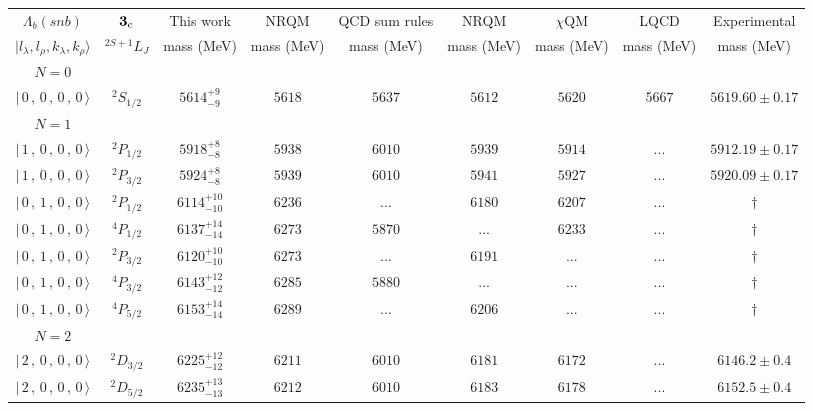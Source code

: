 \begin{tabular}{c c| c c c c c c c}\hline \hline
$\Lambda_{b}(snb)$& ${\bf {3}}_{\rm c}$& This work   &   NRQM \cite{Yoshida2015}     &  QCD sum rules \cite{Liu2008, Mao2015, Chen2016}      &  NRQM \cite{Roberts2008}    & $\chi$QM \cite{Kim2021}        & LQCD \cite{Mohanta2020}     & Experimental  \\ 
 $\vert l_{\lambda}, l_{\rho}, k_{\lambda}, k_{\rho} \rangle$ & $^{2S+1}L_{J}$ & mass (MeV)  &   mass (MeV)  &  mass (MeV)  &  mass (MeV) & mass (MeV) & mass (MeV) &      mass (MeV) \\ \hline
\hline
 $N=0$  &  &  &  &  &  \\ 
$\vert \,0\,,\,0\,,\,0\,,\,0 \,\rangle $ & $^{2}S_{1/2}$ & $5614^{+9}_{-9}$ & $5618$ & $5637$ & $5612$ & $5620$ & $5667$ & $5619.60\pm 0.17$ \\ 
\hline
 $N=1$  &  &  &  &  &  \\ 
$\vert \,1\,,\,0\,,\,0\,,\,0 \,\rangle $ & $^{2}P_{1/2}$ & $5918^{+8}_{-8}$ & $5938$ & $6010$ & $5939$ & $5914$ & ... & $5912.19\pm 0.17$ \\ 
$\vert \,1\,,\,0\,,\,0\,,\,0 \,\rangle $ & $^{2}P_{3/2}$ & $5924^{+8}_{-8}$ & $5939$ & $6010$ & $5941$ & $5927$ & ... & $5920.09\pm 0.17$ \\ 
$\vert \,0\,,\,1\,,\,0\,,\,0 \,\rangle $ & $^{2}P_{1/2}$ & $6114^{+10}_{-10}$ & $6236$ & ... & $6180$ & $6207$ & ... & $\dagger$ \\ 
$\vert \,0\,,\,1\,,\,0\,,\,0 \,\rangle $ & $^{4}P_{1/2}$ & $6137^{+14}_{-14}$ & $6273$ & $5870$ & ... & $6233$ & ... & $\dagger$ \\ 
$\vert \,0\,,\,1\,,\,0\,,\,0 \,\rangle $ & $^{2}P_{3/2}$ & $6120^{+10}_{-10}$ & $6273$ & ... & $6191$ & ... & ... & $\dagger$ \\ 
$\vert \,0\,,\,1\,,\,0\,,\,0 \,\rangle $ & $^{4}P_{3/2}$ & $6143^{+12}_{-12}$ & $6285$ & $5880$ & ... & ... & ... & $\dagger$ \\ 
$\vert \,0\,,\,1\,,\,0\,,\,0 \,\rangle $ & $^{4}P_{5/2}$ & $6153^{+14}_{-14}$ & $6289$ & ... & $6206$ & ... & ... & $\dagger$ \\ 
\hline
 $N=2$  &  &  &  &  &  \\ 
$\vert \,2\,,\,0\,,\,0\,,\,0 \,\rangle $ & $^{2}D_{3/2}$ & $6225^{+12}_{-12}$ & $6211$ & $6010$ & $6181$ & $6172$ & ... & $6146.2\pm 0.4$ \\ 
$\vert \,2\,,\,0\,,\,0\,,\,0 \,\rangle $ & $^{2}D_{5/2}$ & $6235^{+13}_{-13}$ & $6212$ & $6010$ & $6183$ & $6178$ & ... & $6152.5\pm 0.4$ \\ 

\end{tabular}

